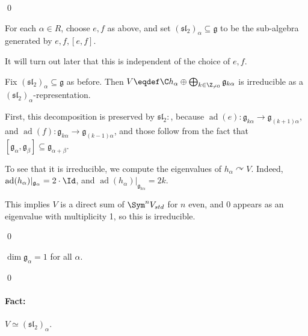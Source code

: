 \documentclass[x11names,reqno,14pt]{extarticle}
\newcommand{\mk}[1]{\mathfrak{#1}}
\newcommand{\g}{\mk{g}}
\DeclareMathOperator{\ad}{ad}
\renewcommand{\sl}{\mk{s}\mk{l}}
\begin{document}
\qed


For each $\alpha \in R$, choose $e, f$ as above, and set $(\sl_2)_\alpha \subseteq \g$ to be the sub-algebra generated by $e, f, [e,f]$. 

It will turn out later that this is independent of the choice of $e, f$. 

\lem

Fix $(\sl_2)_\alpha \subseteq \g$ as before. Then $V \eqdef \C h_\alpha \oplus \bigoplus_{k\in \Z_{\neq0}}\g_{k\alpha}$ is irreducible as a $(\sl_2)_\alpha$-representation. 

\proof

First, this decomposition is preserved by $\sl_2:$, because $\ad(e):\g_{k\alpha} \to \g_{(k+1)\alpha}$, and $\ad(f):\g_{k\alpha}\to\g_{(k-1)\alpha}$, and those follow from the fact that $[\g_\alpha,\g_\beta]\subseteq\g_{\alpha+\beta}$. 

To see that it is irreducible, we compute the eigenvalues of $h_\alpha \curvearrowright V$. Indeed, $\ad(h_\alpha)|_{\g_\alpha} = 2\cdot\Id$, and $\ad(h_\alpha)|_{\g_{k\alpha}} = 2k$. 

This implies $V$ is a direct sum of $\Sym^n V_{std}$ for $n$ even, and 0 appears as an eigenvalue with multiplicity 1, so this is irreducible. 

\qed

\cor

$\dim \g_\alpha = 1$ for all $\alpha$. 

\proof

\qed

\paragraph{Fact:} $V \simeq (\sl_2)_\alpha$. 
\end{document}

